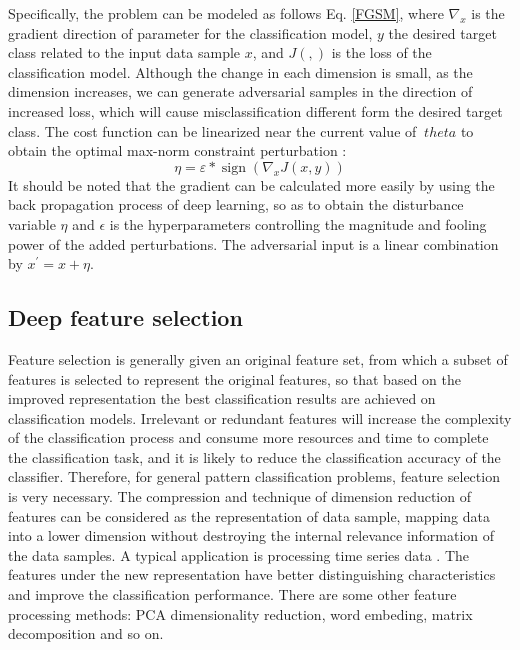 \documentclass{ieeeaccess}
\begin{document}
Specifically, the problem can be modeled as follows Eq. \ref{FGSM}, where $\nabla_{x}$ is the gradient direction of parameter for the classification model, $y$ the desired target class related to the input data sample $x$, and $J(,)$ is the loss of the classification model. Although the change in each dimension is small, as the dimension increases, we can generate adversarial samples in the direction of increased loss, which will cause misclassification different form the desired target class. The cost function can be linearized near the current value of $ \ theta $ to obtain the optimal max-norm constraint perturbation \cite{carrara2017detecting}:
\begin{equation}
\eta = \varepsilon * \operatorname{sign}\left(\nabla_{x} J(x, y)\right)
\label{FGSM}
\end{equation}
It should be noted that the gradient can be calculated more easily by using the back propagation process of deep learning, so as to obtain the disturbance variable $\eta$ and $\epsilon$ is the hyperparameters controlling the magnitude and fooling power of the added perturbations. The adversarial input is a linear combination by $x^{\prime}=x+\eta$.

\subsection{Deep feature selection}
Feature selection is generally given an original feature set, from which a subset of features is selected to represent the original features, so that based on the improved representation the best classification results are achieved on classification models. Irrelevant or redundant features will increase the complexity of the classification process and consume more resources and time to complete the classification task, and it is likely to reduce the classification accuracy of the classifier. Therefore, for general pattern classification problems, feature selection is very necessary.
The compression and technique of dimension reduction of features can be considered as the representation of data sample, mapping data into a lower dimension without destroying the internal relevance information of the data samples. 
A typical application is processing time series data \cite{zhang2018nearest}. The features under the new representation have better distinguishing characteristics and improve the classification performance.
There are some other feature processing methods: PCA dimensionality reduction, word embeding\cite{gao2018self}, matrix decomposition \cite{karampatziakis2013discriminative} and so on. 
\end{document}
